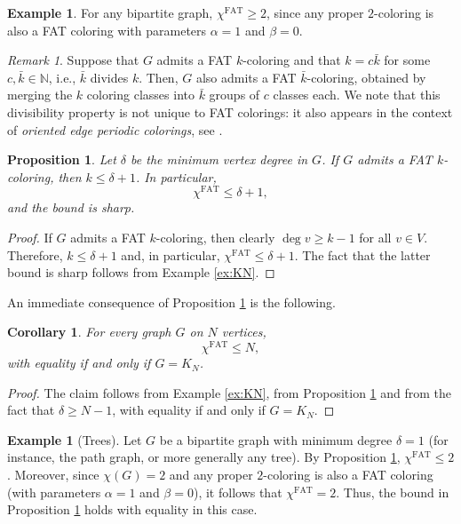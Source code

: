 \documentclass{article}
\theoremstyle{plain}
\newtheorem{proposition}[theorem]{Proposition}
\newtheorem{corollary}[theorem]{Corollary}
\theoremstyle{definition}
\newtheorem{example}[theorem]{Example}
\theoremstyle{remark}
\newtheorem{remark}[theorem]{Remark}
\begin{document}
\begin{example}\label{ex:bipartite>=2}
For any bipartite graph, $\chi^{\mathrm{FAT}}\geq 2$, since any proper $2$-coloring is also a FAT coloring with parameters $\alpha=1$ and $\beta=0$.
\end{example}


\begin{remark}\label{rmk:merging}
Suppose that $G$ admits a FAT $k$-coloring and that $k = c \bar{k}$ for some $c,\bar{k} \in \mathbb{N}$, 
i.e., $\bar{k}$ divides $k$. Then, $G$ also admits a FAT $\bar{k}$-coloring, obtained by merging the $k$ coloring classes into $\bar{k}$ groups of $c$ classes each. We note that this divisibility property is not unique to FAT colorings: it also appears in the context of \emph{oriented edge periodic colorings}, see \cite[Theorem 4]{maximal-colouring}.
\end{remark}



\begin{proposition}\label{prop:delta+1}
Let $\delta$ be the minimum vertex degree in $G$. If $G$ admits a FAT $k$-coloring, then $k\leq \delta+1$. In particular, $$\chi^{\textrm{FAT}}\leq \delta+1,$$ and the bound is sharp.
\end{proposition}
\begin{proof}
If $G$ admits a FAT $k$-coloring, then clearly $\deg v\geq k-1$ for all $v\in V$. Therefore, $k\leq \delta+1$ and, in particular, $\chi^{\textrm{FAT}}\leq \delta+1$. The fact that the latter bound is sharp follows from Example \ref{ex:KN}.
\end{proof}

An immediate consequence of Proposition \ref{prop:delta+1} is the following.

\begin{corollary}
    For every graph $G$ on $N$ vertices,
    $$\chi^{\textrm{FAT}}\leq N,$$
    with equality if and only if $G=K_N$.
\end{corollary}



\begin{proof}
    The claim follows from Example \ref{ex:KN}, from Proposition \ref{prop:delta+1} and from the fact that $\delta\geq N-1$, with equality if and only if $G=K_N$.
\end{proof}



\begin{example}[Trees]\label{ex:trees}
Let $G$ be a bipartite graph with minimum degree $\delta=1$ (for instance, the path graph, or more generally any tree). By Proposition \ref{prop:delta+1}, $\chi^{\mathrm{FAT}} \leq 2$. 
Moreover, since $\chi(G)=2$ and any proper $2$-coloring is also a FAT coloring (with parameters $\alpha=1$ and $\beta=0$), it follows that $\chi^{\mathrm{FAT}}=2$. Thus, the bound in Proposition \ref{prop:delta+1} holds with equality in this case.
\end{example}
\end{document}
